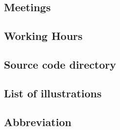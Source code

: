 
\singlespacing    %

\subsection{Meetings}


\subsection{Working Hours}


\subsection{Source code directory}


\subsection{List of illustrations}


\subsection{Abbreviation}


